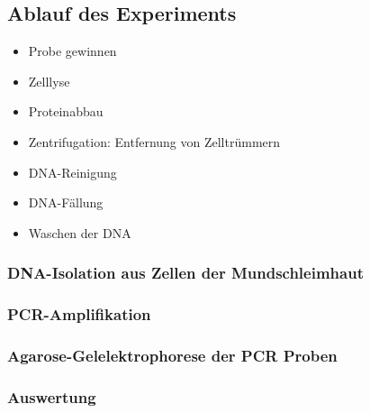 \begin{mechanism}[title=Definition Genetischer Fingerabdruck]
\todo
\end{mechanism}

\subsection{Ablauf des Experiments}
\begin{mechanism}[title=Wie ist der Ablauf zur Gewinnung eines genetischen Fingerabdrucks?]
\todo
\end{mechanism}
\begin{mechanism}[title=Chromosomale DNA-Extraktion - allgemeiner Ablauf]
\begin{itemize}
    \item Probe gewinnen 
    \item Zelllyse
    \item Proteinabbau
    \item Zentrifugation: Entfernung von Zelltrümmern
    \item DNA-Reinigung
    \item DNA-Fällung
    \item Waschen der DNA
\end{itemize}
\end{mechanism}
\subsubsection{DNA-Isolation aus Zellen der Mundschleimhaut}
\todo

\subsubsection{PCR-Amplifikation}
\todo

\subsubsection{Agarose-Gelelektrophorese der PCR Proben}
\todo

\subsubsection{Auswertung}
\todo

 
